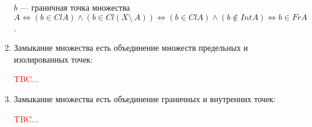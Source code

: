 \documentclass[a4paper,100pt]{article}
\theoremstyle{indented}
\begin{document}
\begin{itemize}
\begin{enumerate}
                $b$ --- граничная точка множества $A \iff (b \in ClA) \wedge (b \in Cl(X \setminus~ A)) \iff (b\in ClA) \wedge (b \notin IntA) \iff b \in FrA$.
            \item Замыкание множества есть объединение множеств предельных и изолированных точек:
            
            \textcolor{red}{TBC...}
            \item Замыкание множества есть объединение граничных и внутренних точек:
            
            \textcolor{red}{TBC...}
        \end{enumerate}
    \end{itemize}
\end{document}
